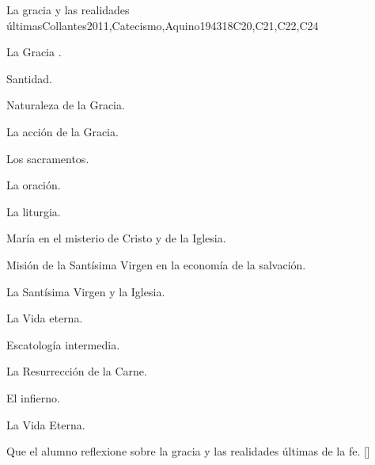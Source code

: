\begin{syllabus}
\begin{unit}{}{La gracia y las realidades últimas}{Collantes2011,Catecismo,Aquino1943}{18}{C20,C21,C22,C24}
\begin{topics}
	\item La Gracia .
	      \begin{subtopics}
		\item Santidad.
		\item Naturaleza de la Gracia.
		\item La acción de la Gracia.
		\item Los sacramentos.
		\item La oración.
		\item La liturgia.
	      \end{subtopics}
	\item María en el misterio de Cristo y de la Iglesia.
	      \begin{subtopics}
		\item Misión de la Santísima Virgen en la economía de la salvación.
		\item La Santísima Virgen y la Iglesia.
	      \end{subtopics}
	\item La Vida eterna.
	      \begin{subtopics}
		\item Escatología intermedia.
		\item La Resurrección de la Carne.
		\item El infierno.
		\item La Vida Eterna.
	      \end{subtopics}
\end{topics}
\begin{learningoutcomes}
	\item Que el alumno reflexione sobre la gracia y las realidades últimas de la fe. [\Usage]
\end{learningoutcomes}
\end{unit}



\begin{coursebibliography}
\end{coursebibliography}
\end{syllabus}

